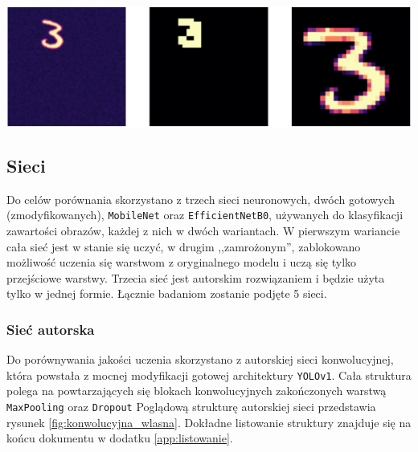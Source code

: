 \documentclass[10pt]{article}
\begin{document}
\begin{center}
  \includegraphics[width=0.7\linewidth]{figures/imagelabel.pdf}
  \label{fig:dane}
\end{center}

\subsection{Sieci}
\label{sec:klasyfikator}

Do celów porównania skorzystano z trzech sieci neuronowych, dwóch gotowych (zmodyfikowanych), \verb+MobileNet+ oraz \verb+EfficientNetB0+, używanych do klasyfikacji zawartości obrazów, każdej z nich w dwóch wariantach. W pierwszym wariancie cała sieć jest w stanie się uczyć, w drugim ,,zamrożonym'', zablokowano możliwość uczenia się warstwom z oryginalnego modelu i uczą się tylko przejściowe warstwy. Trzecia sieć jest autorskim rozwiązaniem i będzie użyta tylko w jednej formie. Łącznie badaniom zostanie podjęte 5 sieci.

\subsubsection{Sieć autorska}
\label{subsec:autorska}

Do porównywania jakości uczenia skorzystano z autorskiej sieci konwolucyjnej, która powstała z mocnej modyfikacji gotowej architektury \verb+YOLOv1+. Cała struktura polega na powtarzających się blokach konwolucyjnych zakończonych warstwą \verb+MaxPooling+ oraz \verb+Dropout+ Poglądową strukturę autorskiej sieci przedstawia rysunek \ref{fig:konwolucyjna_wlasna}. Dokładne listowanie struktury znajduje się na końcu dokumentu w dodatku \ref{app:listowanie}.

\begin{center}
  \centering
  \def\svgwidth{0.9\linewidth}
  
  \label{fig:konwolucyjna_wlasna}
\end{center}
\end{document}
